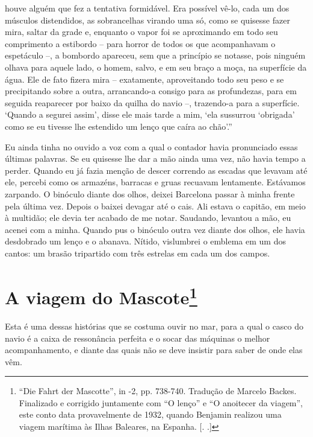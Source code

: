 houve alguém que fez a tentativa formidável. Era possível vê-lo, cada um
dos músculos distendidos, as sobrancelhas virando uma só, como se
quisesse fazer mira, saltar da grade e, enquanto o vapor foi se
aproximando em todo seu comprimento a estibordo -- para horror de todos
os que acompanhavam o espetáculo --, a bombordo apareceu, sem que a
princípio se notasse, pois ninguém olhava para aquele lado, o homem,
salvo, e em seu braço a moça, na superfície da água. Ele de fato fizera
mira -- exatamente, aproveitando todo seu peso e se precipitando sobre a
outra, arrancando-a consigo para as profundezas, para em seguida
reaparecer por baixo da quilha do navio --, trazendo-a para a
superfície. `Quando a segurei assim', disse ele mais tarde a mim, `ela
sussurrou `obrigada' como se eu tivesse lhe estendido um lenço que caíra
ao chão'.''\label{supra9}

Eu ainda tinha no ouvido a voz com a qual o contador havia pronunciado
essas últimas palavras. Se eu quisesse lhe dar a mão ainda uma vez, não
havia tempo a perder. Quando eu já fazia menção de descer correndo as
escadas que levavam até ele, percebi como os armazéns, barracas e gruas
recuavam lentamente. Estávamos zarpando. O binóculo diante dos olhos,
deixei Barcelona passar à minha frente pela última vez. Depois o baixei
devagar até o cais. Ali estava o capitão, em meio à multidão; ele devia
ter acabado de me notar. Saudando, levantou a mão, eu acenei com a
minha. Quando pus o binóculo outra vez diante dos olhos, ele havia
desdobrado um lenço e o abanava. Nítido, vislumbrei o emblema em um dos
cantos: um brasão tripartido com três estrelas em cada um dos campos.

\chapter{A viagem do Mascote\footnote[*]{``Die Fahrt der Mascotte'', in  -2, pp.
  738-740. Tradução de Marcelo Backes. Finalizado e corrigido juntamente
  com ``O lenço'' e ``O anoitecer da viagem'', este conto data
  provavelmente de 1932, quando Benjamin realizou uma viagem marítima às
  Ilhas Baleares, na Espanha. [. .]} }

Esta é uma dessas histórias que se costuma ouvir no mar, para a qual o
casco do navio é a caixa de ressonância perfeita e o socar das máquinas
o melhor acompanhamento, e diante das quais não se deve insistir para
saber de onde elas vêm.

